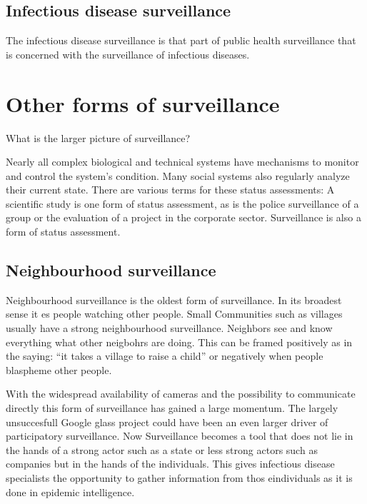 \documentclass[
  letterpaper,
  DIV=11,
  numbers=noendperiod]{scrreprt}
\begin{document}
\section{Infectious disease
surveillance}\label{infectious-disease-surveillance}

The infectious disease surveillance is that part of public health
surveillance that is concerned with the surveillance of infectious
diseases.

\chapter{Other forms of surveillance}\label{other-forms-of-surveillance}

What is the larger picture of surveillance?

\hfill\break

Nearly all complex biological and technical systems have mechanisms to
monitor and control the system's condition. Many social systems also
regularly analyze their current state. There are various terms for these
status assessments: A scientific study is one form of status assessment,
as is the police surveillance of a group or the evaluation of a project
in the corporate sector. Surveillance is also a form of status
assessment.

\section{Neighbourhood surveillance}\label{neighbourhood-surveillance}

Neighbourhood surveillance is the oldest form of surveillance. In its
broadest sense it es people watching other people. Small Communities
such as villages usually have a strong neighbourhood surveillance.
Neighbors see and know everything what other neigbohrs are doing. This
can be framed positively as in the saying: ``it takes a village to raise
a child'' or negatively when people blaspheme other people.

With the widespread availability of cameras and the possibility to
communicate directly this form of surveillance has gained a large
momentum. The largely unsuccesfull Google glass project could have been
an even larger driver of participatory surveillance. Now Surveillance
becomes a tool that does not lie in the hands of a strong actor such as
a state or less strong actors such as companies but in the hands of the
individuals. This gives infectious disease specialists the opportunity
to gather information from thos eindividuals as it is done in epidemic
intelligence.
\end{document}
